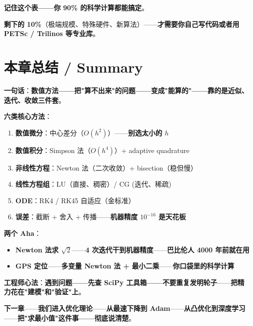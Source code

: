 \textbf{记住这个表——你 90\% 的科学计算都能搞定}。

\textbf{剩下的 10\%}（极端规模、特殊硬件、新算法）——\textbf{才需要你自己写代码或者用 PETSc / Trilinos 等专业库}。

\section{本章总结 / Summary}

\begin{tcolorbox}[essbox={本章关键收获}]
\textbf{一句话}：\textbf{数值方法——把"算不出来"的问题——变成"能算的"——靠的是近似、迭代、收敛三件套}。

\medskip

\textbf{六类核心方法}：
\begin{enumerate}
\item \textbf{数值微分}：中心差分（$O(h^2)$）——\textbf{别选太小的 $h$}
\item \textbf{数值积分}：Simpson 法（$O(h^4)$）+ adaptive quadrature
\item \textbf{非线性方程}：Newton 法（二次收敛）+ bisection（稳但慢）
\item \textbf{线性方程组}：LU（直接、稠密）/ CG (迭代、稀疏)
\item \textbf{ODE}：RK4 / RK45 自适应（金标准）
\item \textbf{误差}：截断 + 舍入 + 传播——\textbf{机器精度 $10^{-16}$ 是天花板}
\end{enumerate}

\medskip

\textbf{两个 Aha}：
\begin{itemize}
\item \textbf{Newton 法求 $\sqrt{2}$}——\textbf{4 次迭代干到机器精度}——\textbf{巴比伦人 4000 年前就在用}
\item \textbf{GPS 定位}——\textbf{多变量 Newton 法 + 最小二乘}——\textbf{你口袋里的科学计算}
\end{itemize}

\medskip

\textbf{工程师心法}：\textbf{遇到问题——先查 SciPy 工具箱——不要重复发明轮子}——\textbf{把精力花在"建模"和"验证"上}。
\end{tcolorbox}

\textbf{下一章}——\textbf{我们进入}\textbf{优化理论}——\textbf{从最速下降到 Adam}——\textbf{从凸优化到深度学习}——\textbf{把"求最小值"这件事——彻底说清楚}。

\clearpage

